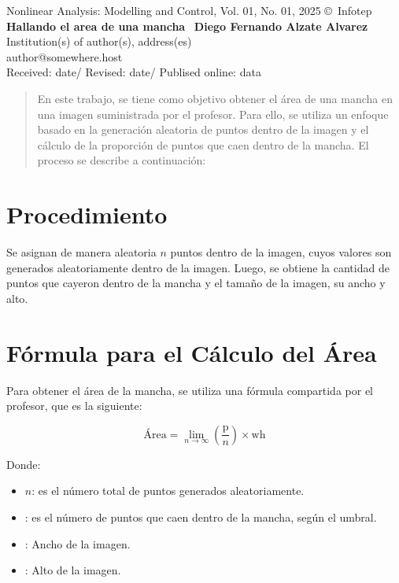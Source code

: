 \documentclass[a4paper, 10pt]{article}
\begin{document}
\begin{center}
Nonlinear Analysis: Modelling and Control, Vol. 01, No. 01, 2025
\copyright\ Infotep\\[24pt]
\LARGE
\textbf{Hallando el area de una mancha}\
\small
\textbf {Diego Fernando Alzate Alvarez}\\[6pt]
Institution(s) of author(s), address(es) \\ author@somewhere.host\\[6pt]
Received: date\quad/\quad
Revised: date\quad/\quad
Publised online: data
\end{center}

\begin{abstract}
En este trabajo, se tiene como objetivo obtener el área de una mancha en una imagen suministrada por el profesor. Para ello, se utiliza un enfoque basado en la generación aleatoria de puntos dentro de la imagen y el cálculo de la proporción de puntos que caen dentro de la mancha. El proceso se describe a continuación:
 \vskip 2mm

\end{abstract}

\nocite{2009ProcDETAp}

\section{Procedimiento}
Se asignan de manera aleatoria $n$ puntos dentro de la imagen, cuyos valores son generados aleatoriamente dentro de la imagen. Luego, se obtiene la cantidad de puntos que cayeron dentro de la mancha y el tamaño de la imagen, su ancho y alto. 
\section{Fórmula para el Cálculo del Área}
Para obtener el área de la mancha, se utiliza una fórmula compartida por el profesor, que es la siguiente:

\[
\text{Área} = \lim_{n \to \infty} \left( \frac{\text{p}}{n} \right) \times \text{wh}
\]

Donde:
\begin{itemize}
    \item $n$: es el número total de puntos generados aleatoriamente.
    \item \text{p}: es el número de puntos que caen dentro de la mancha, según el umbral.
\item \text{w}: Ancho de la imagen.
\item {}: Alto de la imagen.
    \end{itemize}
\end{document}
